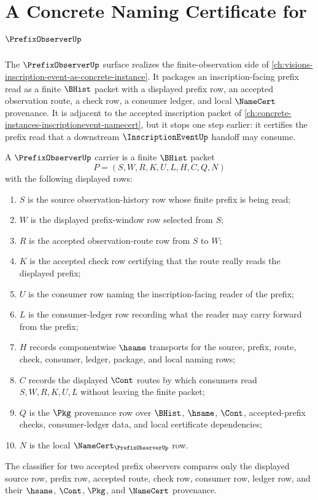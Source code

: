 \chapter{A Concrete Naming Certificate for $\PrefixObserverUp$}
\label{ch:concrete-instances-prefixobserver-namecert}

The $\PrefixObserverUp$ surface realizes the finite-observation side of
\autoref{ch:visions-inscription-event-as-concrete-instance}. It packages an
inscription-facing prefix read as a finite $\BHist$ packet with a displayed
prefix row, an accepted observation route, a check row, a consumer ledger,
and local $\NameCert$ provenance. It is adjacent to the accepted inscription
packet of \autoref{ch:concrete-instances-inscriptionevent-namecert}, but it
stops one step earlier: it certifies the prefix read that a downstream
$\InscriptionEventUp$ handoff may consume.

\begin{definition}
\label{def:prefix-observer-carrier}
A $\PrefixObserverUp$ carrier is a finite $\BHist$ packet
$$
P=(S,W,R,K,U,L,H,C,Q,N)
$$
with the following displayed rows:
\begin{enumerate}
\item $S$ is the source observation-history row whose finite prefix is being read;
\item $W$ is the displayed prefix-window row selected from $S$;
\item $R$ is the accepted observation-route row from $S$ to $W$;
\item $K$ is the accepted check row certifying that the route really reads the displayed prefix;
\item $U$ is the consumer row naming the inscription-facing reader of the prefix;
\item $L$ is the consumer-ledger row recording what the reader may carry forward from the prefix;
\item $H$ records componentwise $\hsame$ transports for the source, prefix, route, check, consumer, ledger, package, and local naming rows;
\item $C$ records the displayed $\Cont$ routes by which consumers read $S,W,R,K,U,L$ without leaving the finite packet;
\item $Q$ is the $\Pkg$ provenance row over $\BHist$, $\hsame$, $\Cont$, accepted-prefix checks, consumer-ledger data, and local certificate dependencies;
\item $N$ is the local $\NameCert_{\PrefixObserverUp}$ row.
\end{enumerate}
The classifier for two accepted prefix observers compares only the displayed
source row, prefix row, accepted route, check row, consumer row, ledger row,
and their $\hsame$, $\Cont$, $\Pkg$, and $\NameCert$ provenance.
\end{definition}

